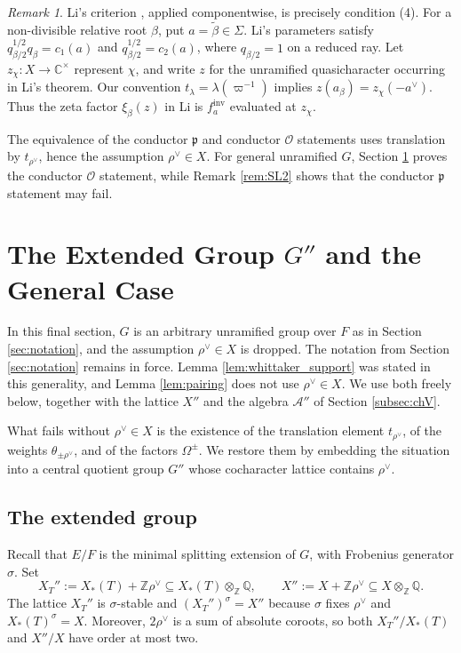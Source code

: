 \documentclass[12pt]{article}
\numberwithin{equation}{section}
\theoremstyle{definition}
\theoremstyle{remark}
\newtheorem{remark}[theorem]{Remark}
\theoremstyle{plain}
\begin{document}
\begin{remark}\label{rem:Li}
Li's criterion \cite[Theorem 2.2]{Li92}, applied componentwise, is precisely condition (4). For a non-divisible relative root $\beta$, put $a=\tilde\beta\in\Sigma$. Li's parameters satisfy $q_{\beta/2}^{1/2}q_\beta=c_1(a)$ and $q_{\beta/2}^{1/2}=c_2(a)$, where $q_{\beta/2}=1$ on a reduced ray. Let $z_\chi:X\to\mathbb C^\times$ represent $\chi$, and write $z$ for the unramified quasicharacter occurring in Li's theorem. Our convention $t_\lambda=\lambda(\varpi^{-1})$ implies $z(a_\beta)=z_\chi(-a^\vee)$. Thus the zeta factor $\xi_\beta(z)$ in Li is $f_a^{\mathrm{inv}}$ evaluated at $z_\chi$.

The equivalence of the conductor $\mathfrak{p}$ and conductor $\mathcal{O}$ statements uses translation by $t_{\rho^\vee}$, hence the assumption $\rho^\vee\in X$. For general unramified $G$, Section \ref{sec:extended} proves the conductor $\mathcal{O}$ statement, while Remark \ref{rem:SL2} shows that the conductor $\mathfrak{p}$ statement may fail.
\end{remark}

\section{The Extended Group \texorpdfstring{$G''$}{G''} and the General Case}\label{sec:extended}

In this final section, $G$ is an arbitrary unramified group over $F$ as in Section \ref{sec:notation}, and the assumption $\rho^\vee \in X$ is dropped. The notation from Section \ref{sec:notation} remains in force. Lemma \ref{lem:whittaker_support} was stated in this generality, and Lemma \ref{lem:pairing} does not use $\rho^\vee \in X$. We use both freely below, together with the lattice $X''$ and the algebra $\mathcal{A}''$ of Section \ref{subsec:chV}.

What fails without $\rho^\vee \in X$ is the existence of the translation element $t_{\rho^\vee}$, of the weights $\theta_{\pm\rho^\vee}$, and of the factors $\Omega^{\pm}$. We restore them by embedding the situation into a central quotient group $G''$ whose cocharacter lattice contains $\rho^\vee$.

\subsection{The extended group}

Recall that $E/F$ is the minimal splitting extension of $G$, with Frobenius generator $\sigma$.
Set
$$X_T'' := X_*(T)+\mathbb Z\rho^\vee
\subseteq X_*(T)\otimes_{\mathbb Z}\mathbb Q,\qquad
X'' := X+\mathbb Z\rho^\vee
\subseteq X\otimes_{\mathbb Z}\mathbb Q.$$
The lattice $X_T''$ is $\sigma$-stable and $(X_T'')^\sigma=X''$ because $\sigma$ fixes $\rho^\vee$ and $X_*(T)^\sigma=X$. Moreover, $2\rho^\vee$ is a sum of absolute coroots, so both $X_T''/X_*(T)$ and $X''/X$ have order at most two.
\end{document}
